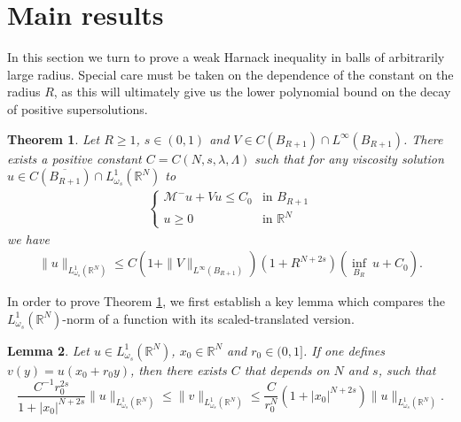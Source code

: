 \documentclass[a4paper,11pt]{article}
\newcommand{\R}{\mathbb{R}}
\newcommand{\M}{\mathcal{M}}
\newcommand{\Lomega}{L_{\omega_s}^1(\R^N)}
\newtheorem{theorem}{Theorem}
\newtheorem{lemma}[theorem]{Lemma}
\begin{document}
\section{Main results}
\label{sect:main}

In this section we turn to prove a weak Harnack inequality in balls of arbitrarily large radius. Special care must be taken on the dependence of the constant on the radius $R$, as this will ultimately give us the lower polynomial bound on the decay of positive supersolutions.

\begin{theorem}
\label{theo:harnack}
Let $R\geq 1$, $s\in (0,1)$ and $V\in C(B_{R+1})\cap L^{\infty}(B_{R+1})$.
There exists a positive constant $C = C(N, s, \lambda, \Lambda)$ such that for any viscosity solution $u\in C(\overline{B_{R+1}}) \cap \Lomega$ to
\begin{align*}
\begin{cases}
\M^-u + Vu \leq C_0 & \text{in }B_{R+1} \\
u\geq 0 & \text{in } \R^N
\end{cases}
\end{align*}
we have
\begin{align}
\label{eq:sharpharnack}
\|u\|_{\Lomega} \leq C(1+\|V\|_{L^{\infty}(B_{R+1})}) (1 + R^{N+2s})\left(\underset{B_R}{\inf}~u + C_0 \right).
\end{align}
\end{theorem}

In order to prove Theorem \ref{theo:harnack}, we first establish a key lemma which compares the $\Lomega$-norm of a function with its scaled-translated version.
\begin{lemma}
	\label{lemma:bounds}
	Let $u \in \Lomega$, $x_0 \in \R^N$ and $r_0 \in (0, 1]$. If one defines $v(y) = u(x_0 + r_0 y)$, then there exists $C$ that depends on $N$ and $s$, such that
	\[\frac{C^{-1}r_0^{2s}}{1+|x_0|^{N+2s}}\|u\|_{\Lomega} \leq \|v\|_{\Lomega} \leq  \frac{C}{r_0^{N}} (1+|x_0|^{N+2s}) \|u\|_{\Lomega}.\]
\end{lemma}
\end{document}
